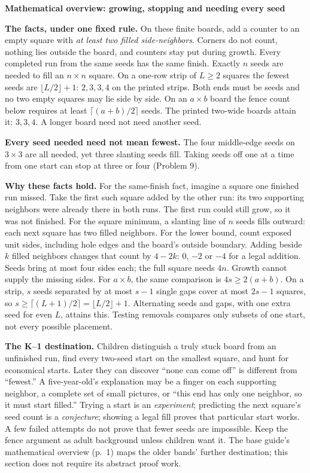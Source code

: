\documentclass[11pt]{article}
\newcommand{\head}[1]{\par\textbf{\large #1}\par}
\begin{document}
\head{Mathematical overview: growing, stopping and needing every seed}
\textbf{The facts, under one fixed rule.} On these finite boards, add a counter to an empty square with \emph{at least two filled side-neighbors}. Corners do not count, nothing lies outside the board, and counters stay put during growth. Every completed run from the same seeds has the same finish. Exactly $n$ seeds are needed to fill an $n\times n$ square. On a one-row strip of $L\ge2$ squares the fewest seeds are $\lfloor L/2\rfloor+1$: $2,3,3,4$ on the printed strips. Both ends must be seeds and no two empty squares may lie side by side. On an $a\times b$ board the fence count below requires at least $\lceil(a+b)/2\rceil$ seeds. The printed two-wide boards attain it: $3,3,4$. A longer board need not need another seed.

\textbf{Every seed needed need not mean fewest.} The four middle-edge seeds on $3\times3$ are all needed, yet three slanting seeds fill. Taking seeds off one at a time from one start can stop at three or four (Problem 9).

\textbf{Why these facts hold.} For the same-finish fact, imagine a square one finished run missed. Take the first such square added by the other run: its two supporting neighbors were already there in both runs. The first run could still grow, so it was not finished. For the square minimum, a slanting line of $n$ seeds fills outward: each next square has two filled neighbors. For the lower bound, count exposed unit sides, including hole edges and the board's outside boundary. Adding beside $k$ filled neighbors changes that count by $4-2k$: $0$, $-2$ or $-4$ for a legal addition. Seeds bring at most four sides each; the full square needs $4n$. Growth cannot supply the missing sides. For $a\times b$, the same comparison is $4s\ge2(a+b)$. On a strip, $s$ seeds separated by at most $s-1$ single gaps cover at most $2s-1$ squares, so $s\ge\lceil(L+1)/2\rceil=\lfloor L/2\rfloor+1$. Alternating seeds and gaps, with one extra seed for even $L$, attains this. Testing removals compares only subsets of one start, not every possible placement.

\textbf{The K--1 destination.} Children distinguish a truly stuck board from an unfinished run, find every two-seed start on the smallest square, and hunt for economical starts. Later they can discover ``none can come off'' is different from ``fewest.'' A five-year-old's explanation may be a finger on each supporting neighbor, a complete set of small pictures, or ``this end has only one neighbor, so it must start filled.'' Trying a start is an \emph{experiment}; predicting the next square's seed count is a \emph{conjecture}; showing a legal fill proves that particular start works. A few failed attempts do not prove that fewer seeds are impossible. Keep the fence argument as adult background unless children want it. The base guide's mathematical overview (p.\ 1) maps the older bands' further destination; this section does not require its abstract proof work.
\end{document}
